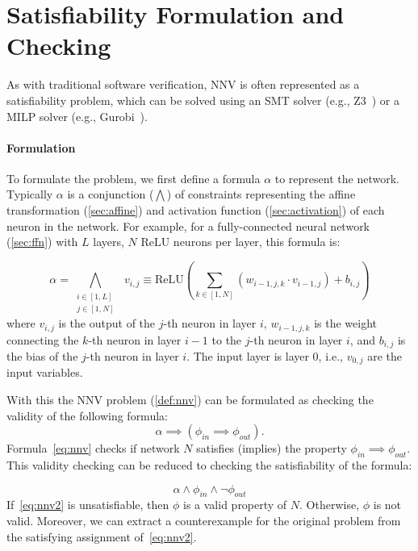 \documentclass[oneside,11pt,dvipsnames]{book}
\numberwithin{equation}{section}
\theoremstyle{definition}
\theoremstyle{remark}
\newcommand{\relu}[1]{\mathrm{ReLU}\left(#1\right)}
\begin{document}
\section{Satisfiability Formulation and Checking}\label{sec:satisfiability-and-activation-pattern-search}

As with traditional software verification, NNV is often represented as a satisfiability problem, which can be solved using an SMT solver (e.g., Z3~\cite{de2008z3}) or a MILP solver (e.g., Gurobi~\cite{gurobi}).

\paragraph{Formulation} To formulate the problem, we first define a formula $\alpha$ to represent the network.
Typically $\alpha$ is a conjunction ($\bigwedge$) of constraints representing the affine transformation (\autoref{sec:affine}) and activation function (\autoref{sec:activation}) of each neuron in the network.
For example, for a fully-connected neural network (\autoref{sec:ffn}) with $L$ layers, $N$ ReLU neurons per layer, this formula is:

\begin{equation}
\alpha = \bigwedge_{\begin{smallmatrix}i \in [1,L]\\ j \in [1,N]\end{smallmatrix}}~~v_{i,j} \equiv \relu{\sum_{k \in [1,N]} (w_{i-1,j,k} \cdot v_{i-1,j}) + b_{i,j}}
\end{equation}
where $v_{i,j}$ is the output of the $j$-th neuron in layer $i$, $w_{i-1,j,k}$ is the weight connecting the $k$-th neuron in layer $i-1$ to the $j$-th neuron in layer $i$, and $b_{i,j}$ is the bias of the $j$-th neuron in layer $i$.  The input layer is layer 0, i.e., $v_{0,j}$ are the input variables.



With this the NNV problem (\autoref{def:nnv}) can be formulated as checking the validity of the following formula:
\begin{equation}\label{eq:nnv}
    \alpha \implies (\phi_{in} \implies \phi_{out}).
\end{equation}
Formula~\autoref{eq:nnv} checks if network $N$ satisfies (implies) the property $\phi_{in} \implies \phi_{out}$. This validity checking can be reduced to checking the satisfiability of the formula:

\begin{equation}\label{eq:nnv2}
  \alpha \land \phi_{in} \land \neg \phi_{out}
\end{equation}
If~\autoref{eq:nnv2} is unsatisfiable, then $\phi$ is a valid property of $N$. Otherwise, $\phi$ is not valid.  Moreover, we can extract a counterexample for the original problem from the satisfying assignment of~\autoref{eq:nnv2}.
\end{document}
